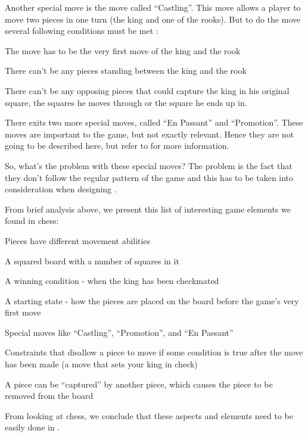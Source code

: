 Another special move is the move called ``Castling''. This move allows a player
to move two pieces in one turn (the king and one of the rooks). But to do the
move several following conditions must be met \cite{chessrules}:
\begin{nlist}
  \item The move has to be the very first move of the king and the rook
  \item There can't be any pieces standing between the king and the rook
  \item There can't be any opposing pieces that could capture the king in his original square, the squares he moves through or the square he ends up in.

\end{nlist}

There exits two more special moves, called ``En Passant'' and
``Promotion''. These moves are important to the game, but not exactly
relevant. Hence they are not going to be described here, but refer to
\cite{chessrules} for more information.

So, what's the problem with these special moves? The problem is the fact that
they don't follow the regular pattern of the game and this has to be taken into
consideration when designing \productname{}.


From brief analysis above, we present this list of interesting game elements we found 
in chess:

\begin{dlist}
\item Pieces have different movement abilities
\item A squared board with a number of squares in it
\item A winning condition - when the king has been checkmated
\item A starting state - how the pieces are placed on the board before the
  game's very first move
\item Special moves like ``Castling'', ``Promotion'', and ``En Passant''
\item Constraints that disallow a piece to move if some condition is true after
  the move has been made (a move that sets your king in check)
\item A piece can be ``captured'' by another piece, which causes the piece to be
  removed from the board
\end{dlist}

From looking at chess, we conclude that these aspects and elements need to be easily done in \productname{}.
